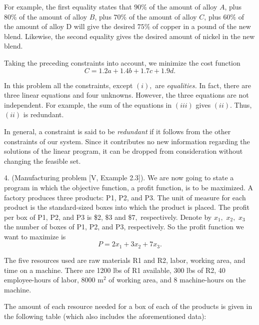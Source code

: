 For example, the first equality states that $90\%$ of the amount of alloy $A$, plus $80\%$ of the amount of alloy $B$, plus $70\%$ of the amount of alloy $C$, plus $60\%$ of the amount of alloy D will give the desired $75\%$ of copper in a pound
of the new blend. Likewise, the second equality gives the desired amount of nickel in the new blend.	
 
 

Taking the preceding constraints into account,  we minimize the cost function
$$C = 1.2a + 1.4b + 1.7c + 1.9d.$$
 

   In this problem all the constraints, except $(i),$ are {\it equalities.} In fact, there are three linear equations and four unknowns. However,  the three equations are not independent. For example, the sum of the equations in $(iii)$ gives $(ii).$ Thus, $(ii)$ is redundant.
\filbreak

 In general, a constraint is said to be {\it redundant} if it follows from the other constraints of our system. Since it contributes no new information regarding the solutions of the linear program, it can be dropped from consideration without changing the feasible set. 


4. (Manufacturing problem [V, Example 2.3]).
We are now going to state a program in which the  objective function, a profit function, is to be maximized. A   factory produces three   products: P1, P2,  and P3. The unit of measure for each product is the standard-sized boxes into which the product is placed. The profit per box of P1, P2,  and P3 is \$2,   $\$3$ and   $\$7,$ respectively. Denote by $x_1,\,\, x_2, \,\,x_3$ the number of boxes of P1, P2,  and P3, respectively. So the profit function we want to maximize is 
$$P = 2x_1 + 3x_2 + 7x_3.$$
 
The five resources used are raw materials R1 and R2,  labor, working area, and time on a   machine. There are 1200 lbs of R1 available,  300 lbs of R2, 40 employee-hours of labor, 8000 m$^2$ of working area,  and 8 machine-hours on the  machine.   

 The amount of each resource needed for a box of each of the products is given in  the following table (which also includes  the aforementioned data):
 

\smallskip
\relax
\centerline{\vbox{\offinterlineskip{}}}
 \smallskip
 \smallskip

